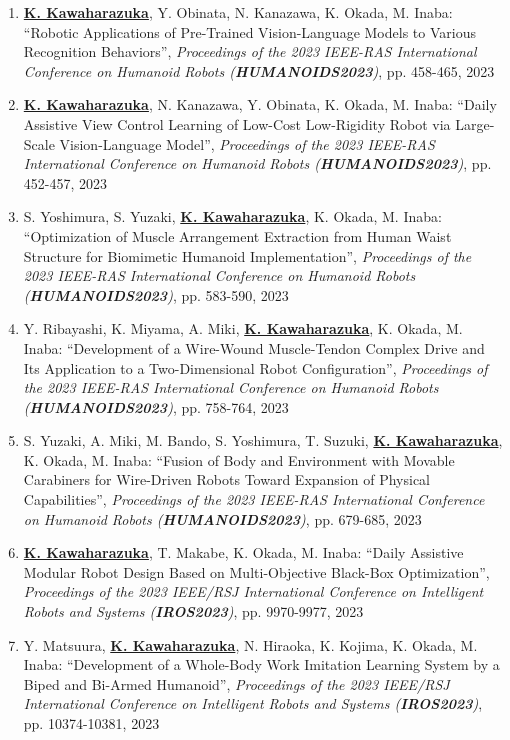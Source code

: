 \documentclass[letterpaper]{article}
\begin{document}
\begin{enumerate}
\item \underline{\textbf{K. Kawaharazuka}}, Y. Obinata, N. Kanazawa, K. Okada, M. Inaba: ``Robotic Applications of Pre-Trained Vision-Language Models to Various Recognition Behaviors'', \textit{Proceedings of the 2023 IEEE-RAS International Conference on Humanoid Robots (\textit{\textbf{HUMANOIDS2023}})}, pp. 458-465, 2023
\item \underline{\textbf{K. Kawaharazuka}}, N. Kanazawa, Y. Obinata, K. Okada, M. Inaba: ``Daily Assistive View Control Learning of Low-Cost Low-Rigidity Robot via Large-Scale Vision-Language Model'', \textit{Proceedings of the 2023 IEEE-RAS International Conference on Humanoid Robots (\textit{\textbf{HUMANOIDS2023}})}, pp. 452-457, 2023
\item S. Yoshimura, S. Yuzaki, \underline{\textbf{K. Kawaharazuka}}, K. Okada, M. Inaba: ``Optimization of Muscle Arrangement Extraction from Human Waist Structure for Biomimetic Humanoid Implementation'', \textit{Proceedings of the 2023 IEEE-RAS International Conference on Humanoid Robots (\textit{\textbf{HUMANOIDS2023}})}, pp. 583-590, 2023
\item Y. Ribayashi, K. Miyama, A. Miki, \underline{\textbf{K. Kawaharazuka}}, K. Okada, M. Inaba: ``Development of a Wire-Wound Muscle-Tendon Complex Drive and Its Application to a Two-Dimensional Robot Configuration'', \textit{Proceedings of the 2023 IEEE-RAS International Conference on Humanoid Robots (\textit{\textbf{HUMANOIDS2023}})}, pp. 758-764, 2023
\item S. Yuzaki, A. Miki, M. Bando, S. Yoshimura, T. Suzuki, \underline{\textbf{K. Kawaharazuka}}, K. Okada, M. Inaba: ``Fusion of Body and Environment with Movable Carabiners for Wire-Driven Robots Toward Expansion of Physical Capabilities'', \textit{Proceedings of the 2023 IEEE-RAS International Conference on Humanoid Robots (\textit{\textbf{HUMANOIDS2023}})}, pp. 679-685, 2023
\item \underline{\textbf{K. Kawaharazuka}}, T. Makabe, K. Okada, M. Inaba: ``Daily Assistive Modular Robot Design Based on Multi-Objective Black-Box Optimization'', \textit{Proceedings of the 2023 IEEE/RSJ International Conference on Intelligent Robots and Systems (\textit{\textbf{IROS2023}})}, pp. 9970-9977, 2023
\item Y. Matsuura, \underline{\textbf{K. Kawaharazuka}}, N. Hiraoka, K. Kojima, K. Okada, M. Inaba: ``Development of a Whole-Body Work Imitation Learning System by a Biped and Bi-Armed Humanoid'', \textit{Proceedings of the 2023 IEEE/RSJ International Conference on Intelligent Robots and Systems (\textit{\textbf{IROS2023}})}, pp. 10374-10381, 2023

\end{enumerate}
\end{document}
